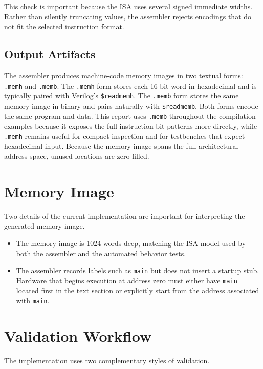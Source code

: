 \documentclass[12pt]{report}
\begin{document}
This check is important because the ISA uses several signed immediate widths.
Rather than silently truncating values, the assembler rejects encodings that do
not fit the selected instruction format.

\subsection{Output Artifacts}

The assembler produces machine-code memory images in two textual forms:
\texttt{.memh} and \texttt{.memb}. The \texttt{.memh} form stores each 16-bit
word in hexadecimal and is typically paired with Verilog's
\texttt{\$readmemh}. The \texttt{.memb} form stores the same memory image in
binary and pairs naturally with \texttt{\$readmemb}. Both forms encode the
same program and data. This report uses \texttt{.memb} throughout the
compilation examples because it exposes the full instruction bit patterns more
directly, while \texttt{.memh} remains useful for compact inspection and for
testbenches that expect hexadecimal input. Because the memory image spans the
full architectural address space, unused locations are zero-filled.

\section{Memory Image}

Two details of the current implementation are important for interpreting the
generated memory image.

\begin{itemize}
    \item The memory image is 1024 words deep, matching the ISA model used by
          both the assembler and the automated behavior tests.
    \item The assembler records labels such as \texttt{main} but does not
          insert a startup stub. Hardware that begins execution at address zero
          must either have \texttt{main} located first in the text section or
          explicitly start from the address associated with \texttt{main}.
\end{itemize}

\section{Validation Workflow}

The implementation uses two complementary styles of validation.
\end{document}
